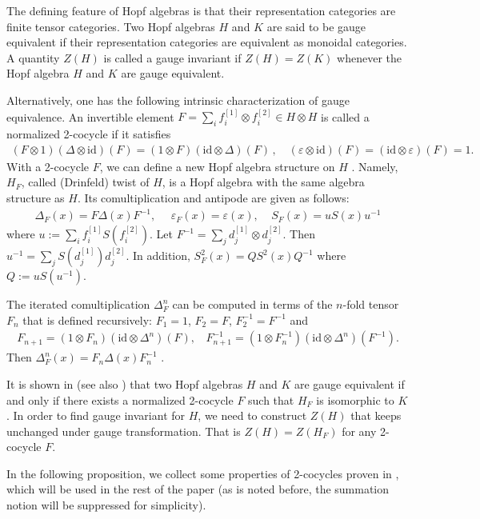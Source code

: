 \documentclass[12pt]{amsart}
\begin{document}
The defining feature of Hopf algebras is that their representation categories are finite tensor categories. Two Hopf algebras $H$ and $K$ are said to be gauge equivalent if their representation categories are equivalent as monoidal categories. A quantity $Z(H)$ is called a gauge invariant if $Z(H)=Z(K)$ whenever the Hopf algebra $H$ and $K$ are gauge equivalent. 

Alternatively, one has the following intrinsic characterization of gauge equivalence. An invertible element $F=\sum\limits_{i}f^{[1]}_i\otimes f^{[2]}_i\in H\otimes H$ is called a normalized 2-cocycle if it satisfies
\[
\begin{aligned}
	(F\otimes 1)(\Delta\otimes \mathrm{id})(F)=(1\otimes F)(\mathrm{id}\otimes\Delta)(F)\,,\quad (\varepsilon\otimes\mathrm{id})(F)=(\mathrm{id}\otimes\varepsilon)(F)=1.
\end{aligned}
\]
With a 2-cocycle $F$, we can define a new Hopf algebra structure on $H$ \cite{KMN12}. Namely, $H_F$, called (Drinfeld) twist of $H$, is a Hopf algebra with the same algebra structure as $H$. Its comultiplication and antipode are given as follows:
\[
\begin{aligned}
\Delta_F(x)=F\Delta(x)F^{-1},~~~~~~\varepsilon_F(x)=\varepsilon(x),~~~~~S_F(x)=uS(x)u^{-1}
\end{aligned}
\]
where $u:=\sum\limits_{i}f^{[1]}_iS(f^{[2]}_i)$. Let $F^{-1}=\sum\limits_{j}d^{[1]}_j\otimes d^{[2]}_j$. Then $u^{-1}=\sum\limits_{j}S(d^{[1]}_j)d^{[2]}_j$. In addition, $S_F^2(x)=QS^2(x)Q^{-1}$ where $Q:=uS(u^{-1})$.

The iterated comultiplication $\Delta^n_F$ can be computed in terms of the $n$-fold tensor $F_n$ that is defined recursively: $F_1=1$, $F_2=F$, $F^{-1}_2=F^{-1}$ and
\[\begin{aligned}
F_{n+1}=(1\otimes F_n)(\mathrm{id}\otimes\Delta^n)(F),~~~~F^{-1}_{n+1}=(1\otimes F^{-1}_n)(\mathrm{id}\otimes\Delta^n)(F^{-1}).
\end{aligned}\]
Then $\Delta_F^n(x)=F_n\Delta(x)F^{-1}_n$ \cite{KMN12}.

It is shown in \cite{NS08} (see also \cite{Sch96,EG02tri}) that two Hopf algebras $H$ and $K$ are gauge equivalent if and only if there exists a normalized 2-cocycle $F$ such that $H_F$ is isomorphic to $K$.  In order to find gauge invariant for $H$, we need to construct $Z(H)$ that keeps unchanged under gauge transformation. That is $Z(H)=Z(H_F)$ for any 2-cocycle $F$. 

In the following proposition, we collect some properties of 2-cocycles proven in \cite{CNW25}, which will be used in the rest of the paper (as is noted before, the summation notion will be suppressed for simplicity).
\end{document}
